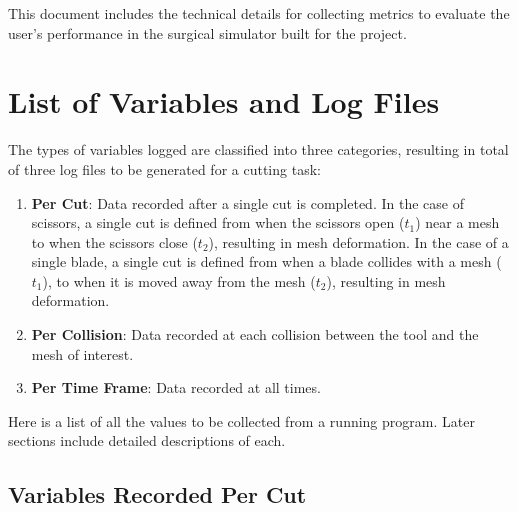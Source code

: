 This document includes the technical details for collecting metrics to evaluate the user's performance in the surgical simulator built for the project.

\section{List of Variables and Log Files}

The types of variables logged are classified into three categories, resulting in  total of three log files to be generated for a cutting task:

\begin{enumerate}[1.]
  \item \textbf{Per Cut}: Data recorded after a single cut is completed. In the case of scissors, a single cut is defined from when the scissors open ($t_1$) near a mesh to when the scissors close ($t_2$), resulting in mesh deformation. In the case of a single blade, a single cut is defined from when a blade collides with a mesh ($t_1$), to when it is moved away from the mesh ($t_2$), resulting in mesh deformation. %
  \item \textbf{Per Collision}: Data recorded at each collision between the tool and the mesh of interest.
  \item \textbf{Per Time Frame}: Data recorded at all times.
\end{enumerate}

Here is a list of all the values to be collected from a running program. Later sections include detailed descriptions of each.

\subsection{Variables Recorded Per Cut}

